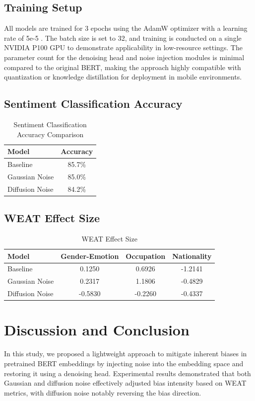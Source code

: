 \documentclass{article}
\begin{document}
\subsection{Training Setup}
All models are trained for 3 epochs using the AdamW optimizer with a learning rate of 5e-5 \cite{loshchilov2018}. The batch size is set to 32, and training is conducted on a single NVIDIA P100 GPU to demonstrate applicability in low-resource settings. The parameter count for the denoising head and noise injection modules is minimal compared to the original BERT, making the approach highly compatible with quantization \cite{banner2018, krishnamoorthi2018} or knowledge distillation \cite{hinton2015, tinybert2020, sun2020mobilebert} for deployment in mobile environments.

\subsection{Sentiment Classification Accuracy}
\begin{table}[htbp]
\centering
\caption{Sentiment Classification Accuracy Comparison}
\begin{tabular}{lc}
\toprule
\textbf{Model} & \textbf{Accuracy} \\
\midrule
Baseline  & 85.7\% \\
Gaussian Noise  & 85.0\% \\
Diffusion Noise & 84.2\% \\
\bottomrule
\end{tabular}
\end{table}

\subsection{WEAT Effect Size}
\begin{table}[htbp]
\centering
\caption{WEAT Effect Size}
\begin{tabular}{lccc}
\toprule
\textbf{Model} & \textbf{Gender-Emotion} & \textbf{Occupation} & \textbf{Nationality} \\
\midrule
Baseline  & 0.1250 & 0.6926 & -1.2141 \\
Gaussian Noise  & 0.2317 & 1.1806 & -0.4829 \\
Diffusion Noise & -0.5830 & -0.2260 & -0.4337 \\
\bottomrule
\end{tabular}
\end{table}

\section{Discussion and Conclusion}
In this study, we proposed a lightweight approach to mitigate inherent biases in pretrained BERT embeddings by injecting noise into the embedding space and restoring it using a denoising head. Experimental results demonstrated that both Gaussian and diffusion noise effectively adjusted bias intensity based on WEAT metrics, with diffusion noise notably reversing the bias direction.
\end{document}
